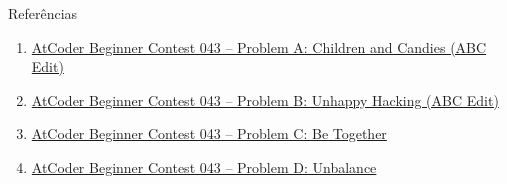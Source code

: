 \begin{frame}[fragile]{Referências}

    \begin{enumerate}
        \item \href{https://atcoder.jp/contests/abc043/tasks/abc043_a}{AtCoder Beginner Contest 
            043 -- Problem A: Children and Candies (ABC Edit)}

        \item \href{https://atcoder.jp/contests/abc043/tasks/abc043_b}{AtCoder Beginner Contest 
            043 -- Problem B: Unhappy Hacking (ABC Edit)}

        \item \href{https://atcoder.jp/contests/abc043/tasks/arc059_a}{AtCoder Beginner Contest
            043 -- Problem C: Be Together}

        \item \href{https://atcoder.jp/contests/abc043/tasks/arc059_b}{AtCoder Beginner Contest
            043 -- Problem D: Unbalance}
    \end{enumerate}

\end{frame}
